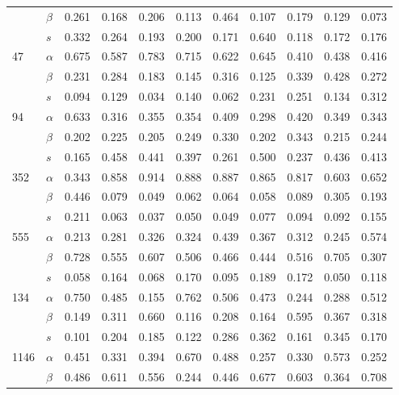 \begin{longtable}{llrrrrrrrrr}
     & $\beta$ & 0.261 & 0.168 & 0.206 & 0.113 & 0.464 & 0.107 & 0.179 & 0.129 & 0.073 \\
     & $s$ & 0.332 & 0.264 & 0.193 & 0.200 & 0.171 & 0.640 & 0.118 & 0.172 & 0.176 \\
\cline{1-11}
\multirow{3}{*}{47} & $\alpha$ & 0.675 & 0.587 & 0.783 & 0.715 & 0.622 & 0.645 & 0.410 & 0.438 & 0.416 \\
     & $\beta$ & 0.231 & 0.284 & 0.183 & 0.145 & 0.316 & 0.125 & 0.339 & 0.428 & 0.272 \\
     & $s$ & 0.094 & 0.129 & 0.034 & 0.140 & 0.062 & 0.231 & 0.251 & 0.134 & 0.312 \\
\cline{1-11}
\multirow{3}{*}{94} & $\alpha$ & 0.633 & 0.316 & 0.355 & 0.354 & 0.409 & 0.298 & 0.420 & 0.349 & 0.343 \\
     & $\beta$ & 0.202 & 0.225 & 0.205 & 0.249 & 0.330 & 0.202 & 0.343 & 0.215 & 0.244 \\
     & $s$ & 0.165 & 0.458 & 0.441 & 0.397 & 0.261 & 0.500 & 0.237 & 0.436 & 0.413 \\
\cline{1-11}
\multirow{3}{*}{352} & $\alpha$ & 0.343 & 0.858 & 0.914 & 0.888 & 0.887 & 0.865 & 0.817 & 0.603 & 0.652 \\
     & $\beta$ & 0.446 & 0.079 & 0.049 & 0.062 & 0.064 & 0.058 & 0.089 & 0.305 & 0.193 \\
     & $s$ & 0.211 & 0.063 & 0.037 & 0.050 & 0.049 & 0.077 & 0.094 & 0.092 & 0.155 \\
\cline{1-11}
\multirow{3}{*}{555} & $\alpha$ & 0.213 & 0.281 & 0.326 & 0.324 & 0.439 & 0.367 & 0.312 & 0.245 & 0.574 \\
     & $\beta$ & 0.728 & 0.555 & 0.607 & 0.506 & 0.466 & 0.444 & 0.516 & 0.705 & 0.307 \\
     & $s$ & 0.058 & 0.164 & 0.068 & 0.170 & 0.095 & 0.189 & 0.172 & 0.050 & 0.118 \\
\cline{1-11}
\multirow{3}{*}{134} & $\alpha$ & 0.750 & 0.485 & 0.155 & 0.762 & 0.506 & 0.473 & 0.244 & 0.288 & 0.512 \\
     & $\beta$ & 0.149 & 0.311 & 0.660 & 0.116 & 0.208 & 0.164 & 0.595 & 0.367 & 0.318 \\
     & $s$ & 0.101 & 0.204 & 0.185 & 0.122 & 0.286 & 0.362 & 0.161 & 0.345 & 0.170 \\
\cline{1-11}
\multirow{3}{*}{1146} & $\alpha$ & 0.451 & 0.331 & 0.394 & 0.670 & 0.488 & 0.257 & 0.330 & 0.573 & 0.252 \\
     & $\beta$ & 0.486 & 0.611 & 0.556 & 0.244 & 0.446 & 0.677 & 0.603 & 0.364 & 0.708 \\

\end{longtable}
